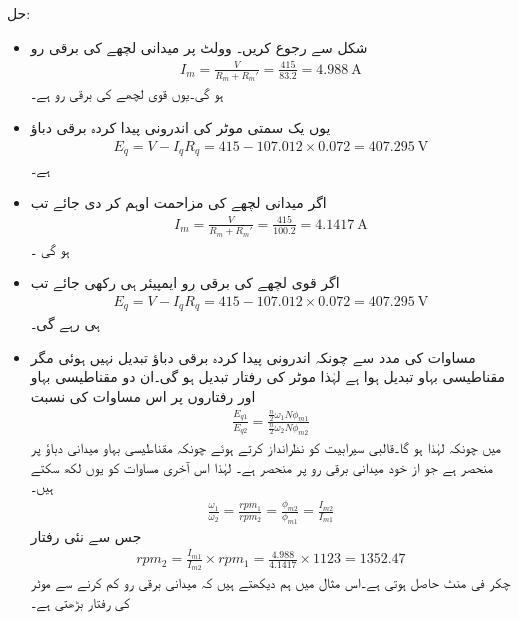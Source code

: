 حل:
\begin{itemize}
\item
شکل   سے رجوع کریں۔ وولٹ پر میدانی لچھے کی برقی رو
\begin{align*}
I_m=\tfrac{V}{R_m+R_m'}=\frac{415}{83.2}=\SI{4.988}{\ampere}
\end{align*}
ہو گی۔یوں قوی لچھے کی برقی رو  ہے۔
\item
یوں یک سمتی موٹر کی اندرونی پیدا کردہ برقی دباؤ
\begin{align*}
E_q=V-I_q R_q=415-107.012\times 0.072=\SI{407.295}{\volt}
\end{align*}
ہے۔
\item
اگر میدانی لچھے کی مزاحمت  اوہم کر دی جائے  تب
\begin{align*}
I_m=\frac{V}{R_m+R_m'}=\frac{415}{100.2}=\SI{4.1417}{\ampere}
\end{align*}
ہو گی ۔
\item
اگر قوی لچھے کی برقی رو  ایمپیئر ہی رکھی جائے تب 
\begin{align*}
E_q=V-I_q R_q=415-107.012 \times 0.072=\SI{407.295}{\volt}
\end{align*}
ہی رہے گی۔
\item
مساوات   کی مدد سے  چونکہ اندرونی پیدا کردہ برقی دباؤ تبدیل نہیں ہوئی مگر مقناطیسی بہاو تبدیل ہوا ہے لہٰذا موٹر کی رفتار تبدیل ہو گی۔ان دو مقناطیسی بہاو اور رفتاروں پر اس مساوات کی نسبت
\begin{align*}
\frac{E_{q1}}{E_{q2}}=\frac{\frac{n}{2} \omega_1 N \phi_{m1}}{\frac{n}{2} \omega_2 N \phi_{m2}}
\end{align*}
میں چونکہ  لہٰذا  ہو گا۔قالبی سیرابیت کو نظرانداز کرتے ہوئے چونکہ مقناطیسی بہاو میدانی دباؤ پر منحصر ہے جو از خود میدانی برقی رو پر منحصر ہے۔ لہٰذا اس آخری مساوات کو یوں لکھ سکتے ہیں۔
\begin{align*}
\frac{\omega_1}{\omega_2}=\frac{rpm_1}{rpm_2}=\frac{\phi_{m2}}{\phi_{m1}}=\frac{I_{m2}}{I_{m1}}
\end{align*}
جس سے نئی رفتار
\begin{align*}
rpm_2=\frac{I_{m1}}{I_{m2}} \times rpm_1=\frac{4.988}{4.1417} \times 1123=1352.47
\end{align*}
چکر فی منٹ حاصل ہوتی ہے۔اس مثال میں ہم دیکھتے ہیں کہ میدانی برقی رو کم کرنے سے موٹر کی رفتار بڑھتی ہے۔
\end{itemize}
%
